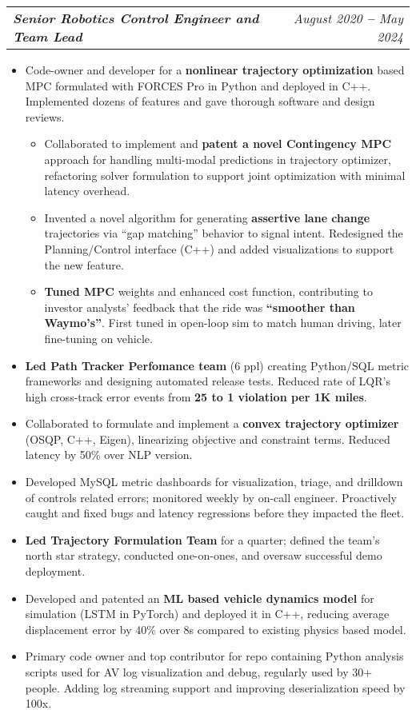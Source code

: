 \documentclass[letterpaper,11pt]{article}
\makeatletter
\def\vspaceAfterBullets{3pt} %
\def\bulletIndent{15pt} %
\newcommand{\bulletItem}[1]{
  \item\small{
    {#1}
  }
}
\newcommand{\titleAndDateHeading}[2]{
    \item
    \begin{tabular*}{1.0\textwidth}[b]{l@{\extracolsep{\fill}}r}
      \textit{\textbf{\small#1}} & \textit{\small #2}
    \end{tabular*}
}
\newcommand{\outerBulletListStart}{\begin{itemize}[leftmargin=\bulletIndent]}
\newcommand{\outerBulletListEnd}{\end{itemize}\vspace{\vspaceAfterBullets}}
\newcommand{\innerBulletListStart}{\begin{itemize}[leftmargin=\bulletIndent]}
\newcommand{\innerBulletListEnd}{\end{itemize}}
\makeatother
\begin{document}
\titleAndDateHeading
{Senior Robotics Control Engineer and Team Lead}{August 2020 \textbf{--} May 2024}
\outerBulletListStart
\bulletItem{Code-owner and developer for a \textbf{nonlinear trajectory optimization} based MPC formulated with FORCES Pro in Python and deployed in C++. Implemented dozens of features and gave thorough software and design reviews.}
\innerBulletListStart
\bulletItem{Collaborated to implement and \textbf{patent a novel Contingency MPC} approach for handling multi-modal predictions in trajectory optimizer, refactoring solver formulation to support joint optimization with minimal latency overhead.}
\bulletItem{Invented a novel algorithm for generating \textbf{assertive lane change} trajectories via \enquote{gap matching} behavior to signal intent. Redesigned the Planning/Control interface (C++) and added visualizations to support the new feature.}
\bulletItem{\textbf{Tuned MPC} weights and enhanced cost function, contributing to investor analysts’ feedback that the ride was \textbf{\enquote{smoother than Waymo’s}}. First tuned in open-loop sim to match human driving, later fine-tuning on vehicle.}
\innerBulletListEnd
\bulletItem{\textbf{Led Path Tracker Perfomance team} (6 ppl) creating Python/SQL metric frameworks and designing automated release tests. Reduced rate of LQR's high cross-track error events from \textbf{25 to 1 violation per 1K miles}.}
\bulletItem{Collaborated to formulate and implement a \textbf{convex trajectory optimizer} (OSQP, C++, Eigen), linearizing objective and constraint terms. Reduced latency by 50\% over NLP version.}
\bulletItem{Developed MySQL metric dashboards for visualization, triage, and drilldown of controls related errors; monitored weekly by on-call engineer. Proactively caught and fixed bugs and latency regressions before they impacted the fleet.}
\bulletItem{\textbf{Led Trajectory Formulation Team} for a quarter; defined the team’s north star strategy, conducted one-on-ones, and oversaw successful demo deployment.}
\bulletItem{Developed and patented an \textbf{ML based vehicle dynamics model} for simulation (LSTM in PyTorch) and deployed it in C++, reducing average displacement error by 40\% over 8s compared to existing physics based model.}
\bulletItem{Primary code owner and top contributor for repo containing Python analysis scripts used for AV log visualization and debug, regularly used by 30+ people. Adding log streaming support and improving deserialization speed by 100x.}
\outerBulletListEnd
\end{document}
